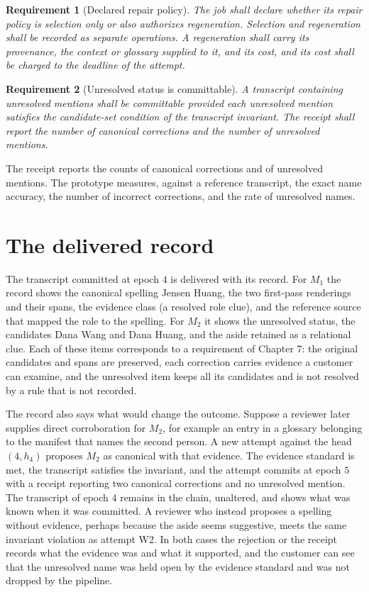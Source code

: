\documentclass[11pt,openany]{book}
\newtheorem{requirement}{Requirement}[chapter]
\theoremstyle{remark}
\begin{document}
\begin{requirement}[Declared repair policy]
The job shall declare whether its repair policy is selection only or also authorizes regeneration. Selection and regeneration shall be recorded as separate operations. A regeneration shall carry its provenance, the context or glossary supplied to it, and its cost, and its cost shall be charged to the deadline of the attempt.
\end{requirement}

\begin{requirement}[Unresolved status is committable]
A transcript containing unresolved mentions shall be committable provided each unresolved mention satisfies the candidate-set condition of the transcript invariant. The receipt shall report the number of canonical corrections and the number of unresolved mentions.
\end{requirement}

The receipt reports the counts of canonical corrections and of unresolved mentions. The prototype measures, against a reference transcript, the exact name accuracy, the number of incorrect corrections, and the rate of unresolved names.

\section{The delivered record}

The transcript committed at epoch $4$ is delivered with its record. For $M_1$ the record shows the canonical spelling Jensen Huang, the two first-pass renderings and their spans, the evidence class (a resolved role clue), and the reference source that mapped the role to the spelling. For $M_2$ it shows the unresolved status, the candidates Dana Wang and Dana Huang, and the aside retained as a relational clue. Each of these items corresponds to a requirement of Chapter 7: the original candidates and spans are preserved, each correction carries evidence a customer can examine, and the unresolved item keeps all its candidates and is not resolved by a rule that is not recorded.

The record also says what would change the outcome. Suppose a reviewer later supplies direct corroboration for $M_2$, for example an entry in a glossary belonging to the manifest that names the second person. A new attempt against the head $(4,h_4)$ proposes $M_2$ as canonical with that evidence. The evidence standard is met, the transcript satisfies the invariant, and the attempt commits at epoch $5$ with a receipt reporting two canonical corrections and no unresolved mention. The transcript of epoch $4$ remains in the chain, unaltered, and shows what was known when it was committed. A reviewer who instead proposes a spelling without evidence, perhaps because the aside seems suggestive, meets the same invariant violation as attempt W2. In both cases the rejection or the receipt records what the evidence was and what it supported, and the customer can see that the unresolved name was held open by the evidence standard and was not dropped by the pipeline.
\end{document}
